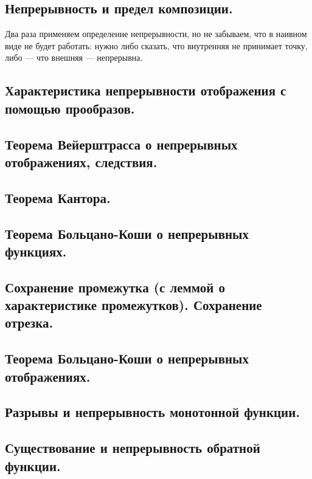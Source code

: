 \documentclass[12pt, a4paper]{article}
\begin{document}
\subsection{Непрерывность и предел композиции.}

Два раза применяем определение непрерывности, но не забываем, 
что в наивном виде не будет работать: 
нужно либо сказать, что внутренняя не принимает точку, 
либо — что внешняя — непрерывна.

\subsection{Характеристика непрерывности отображения с помощью прообразов.}

\subsection{Теорема Вейерштрасса о непрерывных отображениях, следствия.}

\subsection{Теорема Кантора.}

\subsection{Теорема Больцано-Коши о непрерывных функциях.}

\subsection{Сохранение промежутка (с леммой о характеристике промежутков). Сохранение отрезка.}

\subsection{Теорема Больцано-Коши о непрерывных отображениях.}

\subsection{Разрывы и непрерывность монотонной функции.}

\subsection{Существование и непрерывность обратной функции.}
\end{document}
